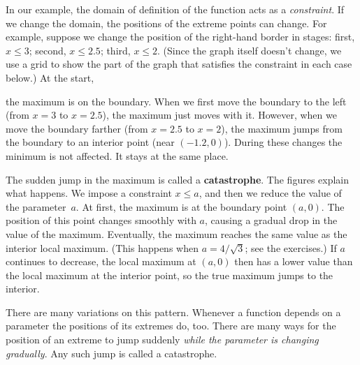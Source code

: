 {{{{        In our example, 
the domain of definition of the function acts as a {\em constraint}.  If we change the domain, the positions of the extreme points can change.  For example, suppose we change the position of the right-hand border in stages: first, $x \leq 3$; second, $x \leq 2.5$; third, $x \leq 2$.  (Since the graph itself doesn't change, we use a grid to show the part of the graph that satisfies the constraint in each case below.)  At the start,
\label{optimum1} 
\linebreak
 
\vspace{12pt}
\vspace{155pt}

\noindent
the maximum is on the boundary.  When we first move the boundary to the left 
(from $x = 3$ to $x = 2.5$), 
the maximum just moves with it.  However, when we move the boundary farther (from $x = 2.5$ to $x = 2$), the maximum jumps from the boundary to an interior point \label{max}(near $(-1.2, 0)$).   During these changes the minimum is not affected.  It stays at the same place.

        The sudden jump in the maximum 
is called a {\bf catastrophe}.  The figures explain what happens.   We impose a constraint $x \leq a$, and then we reduce the value of the parameter~$a$.  At first, the maximum is at the boundary point $(a, 0)$.  The position of this point changes smoothly with $a$, causing a gradual drop in the value of the maximum.  Eventually, the maximum reaches the same value as the interior local maximum.  (This happens when $a = 4/\sqrt{3}$; see the exercises.)   If $a$ continues to decrease, the local maximum at $(a, 0)$ then has a lower value than the local maximum at the interior point, so the true maximum jumps to the interior.  

        There are many variations on this pattern.  Whenever a function depends on a parameter the positions of its extremes do, too.  There are many ways for the position of an extreme to jump suddenly {\em while the parameter is changing gradually}.  Any such jump is called a catastrophe.  
        
        }}}}
